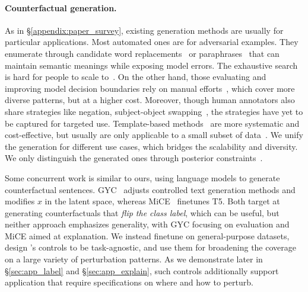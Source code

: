 \paragraph{Counterfactual generation.}
As in \S\ref{appendix:paper_survey}, existing generation methods are usually for particular applications.
Most automated ones are for adversarial examples. 
They enumerate through candidate word replacements~\cite{alzantot2018generating, garg2020bae} or paraphrases~\cite{iyyer2018adversarial, malandrakis-etal-2019-controlled} that can maintain semantic meanings while exposing model errors.
The exhaustive search is hard for people to scale to~\cite{ribeiro2018sear}.
On the other hand, those evaluating and improving model decision boundaries rely on manual efforts~\cite{checklist:acl20}, which cover more diverse patterns, but at a higher cost.
Moreover, though human annotators also share strategies like negation, subject-object swapping~\cite{kaushik2019learning, gardner2020contrast}, the strategies have yet to be captured for targeted use.
Template-based methods~\cite{mccoy2019right, nie2019analyzing} are more systematic and cost-effective, but usually are only applicable to a small subset of data~\cite{li2020linguistically}.
We unify the generation for different use cases, which bridges the scalability and diversity.
We only distinguish the generated ones through posterior constraints~\cite{morris2020textattack, alzantot-etal-2018-generating}.

Some concurrent work is similar to ours, using language models to generate counterfactual sentences. 
GYC~\cite{madaan2020generate} adjusts controlled text generation methods and modifies $x$ in the latent space, whereas MiCE~\cite{ross2020explaining} finetunes T5.
Both target at generating counterfactuals that \emph{flip the class label}, which can be useful, but 
neither approach emphasizes generality, with GYC focusing on evaluation and MiCE aimed at explanation.
We instead finetune \sysname on general-purpose datasets, design \sysname's controls to be task-agnostic, and use them for broadening the coverage on a large variety of perturbation patterns.
As we demonstrate later in \S\ref{sec:app_label} and \S\ref{sec:app_explain}, such controls additionally support application that require specifications on where and how to perturb.






